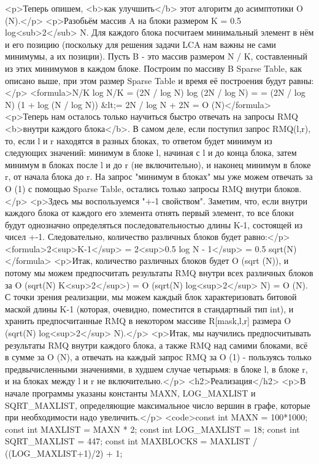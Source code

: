 <p>Теперь опишем, <b>как улучшить</b> этот алгоритм до асимптотики O (N).</p>
<p>Разобьём массив A на блоки размером K = 0.5 log<sub>2</sub> N. Для каждого блока посчитаем минимальный элемент в нём и его позицию (поскольку для решения задачи LCA нам важны не сами минимумы, а их позиции). Пусть B - это массив размером N / K, составленный из этих минимумов в каждом блоке. Построим по массиву B Sparse Table, как описано выше, при этом размер Sparse Table и время её построения будут равны:</p>
<formula>N/K log N/K = (2N / log N) log (2N / log N) =
= (2N / log N) (1 + log (N / log N)) &lt;= 2N / log N + 2N = O (N)</formula>
<p>Теперь нам осталось только научиться быстро отвечать на запросы RMQ <b>внутри каждого блока</b>. В самом деле, если поступил запрос RMQ(l,r), то, если l и r находятся в разных блоках, то ответом будет минимум из следующих значений: минимум в блоке l, начиная с l и до конца блока, затем минимум в блоках после l и до r (не включительно), и наконец минимум в блоке r, от начала блока до r. На запрос "минимум в блоках" мы уже можем отвечать за O (1) с помощью Sparse Table, остались только запросы RMQ внутри блоков.</p>
<p>Здесь мы воспользуемся "+-1 свойством". Заметим, что, если внутри каждого блока от каждого его элемента отнять первый элемент, то все блоки будут однозначно определяться последовательностью длины K-1, состоящей из чисел +-1. Следовательно, количество различных блоков будет равно:</p>
<formula>2<sup>K-1</sup> = 2<sup>0.5 log N - 1</sup> = 0.5 sqrt(N)</formula>
<p>Итак, количество различных блоков будет O (sqrt (N)), и потому мы можем предпосчитать результаты RMQ внутри всех различных блоков за O (sqrt(N) K<sup>2</sup>) = O (sqrt(N) log<sup>2</sup> N) = O (N). С точки зрения реализации, мы можем каждый блок характеризовать битовой маской длины K-1 (которая, очевидно, поместится в стандартный тип int), и хранить предпосчитанные RMQ в некотором массиве R[mask,l,r] размера O (sqrt(N) log<sup>2</sup> N).</p>
<p>Итак, мы научились предпосчитывать результаты RMQ внутри каждого блока, а также RMQ над самими блоками, всё в сумме за O (N), а отвечать на каждый запрос RMQ за O (1) - пользуясь только предвычисленными значениями, в худшем случае четырьмя: в блоке l, в блоке r, и на блоках между l и r не включительно.</p>
<h2>Реализация</h2>
<p>В начале программы указаны константы MAXN, LOG_MAXLIST и SQRT_MAXLIST, определяющие максимальное число вершин в графе, которые при необходимости надо увеличить.</p>
<code>const int MAXN = 100*1000;
const int MAXLIST = MAXN * 2;
const int LOG_MAXLIST = 18;
const int SQRT_MAXLIST = 447;
const int MAXBLOCKS = MAXLIST / ((LOG_MAXLIST+1)/2) + 1;

